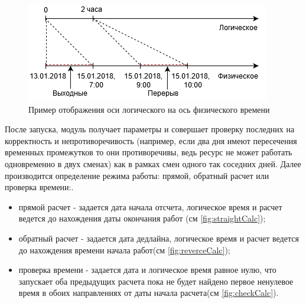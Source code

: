 \begin{figure}[h]
	\includegraphics[width=\linewidth]{pics/scheduleAxes.png}
	\caption{Пример отображения оси логического на ось физического времени}
	\label{fig:axes}
	\centering
\end{figure}

\indent После запуска, модуль получает параметры и совершает проверку последних на корректность и непротиворечивость (например, если два дня имеют пересечения временных промежутков то они противоречивы, ведь ресурс не может работать одновременно в двух сменах) как в рамках смен одного так соседних дней.
Далее производится определение режима работы: прямой, обратный расчет или проверка времени:.

\begin{itemize}
	\item прямой расчет - задается дата начала отсчета, логическое время и расчет ведется до нахождения даты окончания работ (см \ref{fig:straightCalc});
	\item обратный расчет - задается дата дедлайна, логическое время и расчет ведется до нахождения времени начала работ(см \ref{fig:reverceCalc});
	\item проверка времени - задается дата и логическое время равное нулю, что запускает оба предыдущих расчета пока не будет найдено первое ненулевое время в обоих направлениях от даты начала расчета(см \ref{fig:checkCalc}).
\end{itemize}

